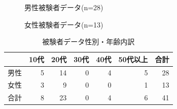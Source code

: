 \begin{figure}[htbp]
  \begin{minipage}{0.5\hsize}
    \begin{center}
    \end{center}
    \caption{男性被験者データ(n=28)}
    \label{fig:malepeople}
  \end{minipage}
  \begin{minipage}{0.5\hsize}
    \begin{center}
    \end{center}
    \caption{女性被験者データ(n=13)}
    \label{fig:femalepople}
  \end{minipage}
\end{figure}

\begin{table}[htb]
  \caption{被験者データ性別・年齢内訳}
  \label{tb:agegenderchart}
  \begin{center}
  \begin{tabular}{|l|r|r|r|r|r||r|} \hline
    　&10代&20代&30代&40代&50代以上&合計 \\ \hline \hline
    男性&5&14&0&4&5&28 \\
    女性&3&9&0&0&1&13 \\ \hline \hline
    合計&8&23&0&4&6&41 \\ \hline
  \end{tabular}
  \end{center}
\end{table}

